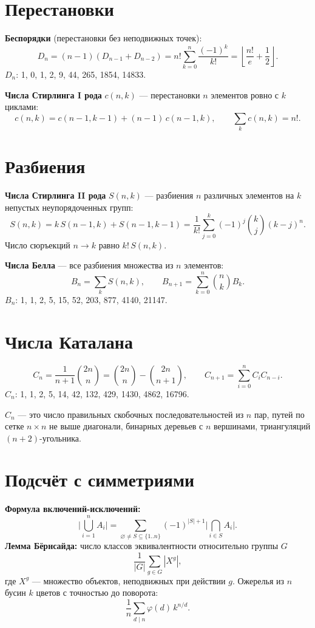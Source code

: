 \section{Перестановки}
\textbf{Беспорядки} (перестановки без неподвижных точек):
\[ D_n = (n-1)(D_{n-1} + D_{n-2}) = n! \sum_{k=0}^{n} \frac{(-1)^k}{k!} = \left\lfloor \frac{n!}{e} + \frac{1}{2} \right\rfloor. \]
$D_n$: 1, 0, 1, 2, 9, 44, 265, 1854, 14833.

\textbf{Числа Стирлинга I рода} $c(n, k)$ --- перестановки $n$ элементов ровно с $k$ циклами:
\[ c(n, k) = c(n-1, k-1) + (n-1)\, c(n-1, k), \qquad \sum_k c(n, k) = n!. \]

\section{Разбиения}
\textbf{Числа Стирлинга II рода} $S(n, k)$ --- разбиения $n$ различных элементов на $k$ непустых неупорядоченных групп:
\[ S(n, k) = k\, S(n-1, k) + S(n-1, k-1) = \frac{1}{k!} \sum_{j=0}^{k} (-1)^j \binom{k}{j} (k-j)^n. \]
Число сюръекций $n \to k$ равно $k!\, S(n, k)$.

\textbf{Числа Белла} --- все разбиения множества из $n$ элементов:
\[ B_n = \sum_{k} S(n, k), \qquad B_{n+1} = \sum_{k=0}^{n} \binom{n}{k} B_k. \]
$B_n$: 1, 1, 2, 5, 15, 52, 203, 877, 4140, 21147.

\section{Числа Каталана}
\[ C_n = \frac{1}{n+1}\binom{2n}{n} = \binom{2n}{n} - \binom{2n}{n+1}, \qquad C_{n+1} = \sum_{i=0}^{n} C_i C_{n-i}. \]
$C_n$: 1, 1, 2, 5, 14, 42, 132, 429, 1430, 4862, 16796.

$C_n$ --- это число правильных скобочных последовательностей из $n$ пар, путей по сетке $n \times n$ не выше диагонали, бинарных деревьев с $n$ вершинами, триангуляций $(n+2)$-угольника.

\section{Подсчёт с симметриями}
\textbf{Формула включений-исключений:}
\[ \Big|\bigcup_{i=1}^{n} A_i\Big| = \sum_{\varnothing \ne S \subseteq \{1..n\}} (-1)^{|S|+1} \Big|\bigcap_{i \in S} A_i\Big|. \]
\textbf{Лемма Бёрнсайда:} число классов эквивалентности относительно группы $G$
\[ \frac{1}{|G|} \sum_{g \in G} |X^g|, \]
где $X^g$ --- множество объектов, неподвижных при действии $g$. Ожерелья из $n$ бусин $k$ цветов с точностью до поворота:
\[ \frac{1}{n} \sum_{d \mid n} \varphi(d)\, k^{n/d}. \]
